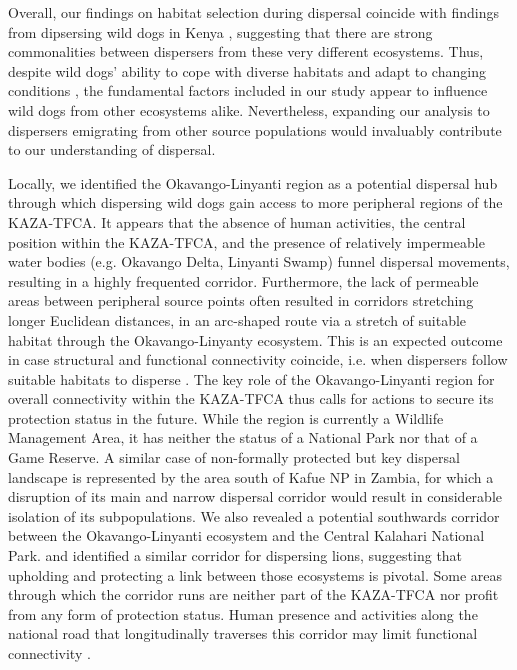 \documentclass[abstract=on,10pt,a4paper,bibliography=totocnumbered]{article}
\begin{document}
Overall, our findings on habitat selection during dispersal coincide with
findings from dipsersing wild dogs in Kenya \citep{Oneill.2020}, suggesting that
there are strong commonalities between dispersers from these very different
ecosystems. Thus, despite wild dogs' ability to cope with diverse habitats and
adapt to changing conditions \citep{Woodroffe.2011}, the fundamental factors
included in our study appear to influence wild dogs from other ecosystems alike.
Nevertheless, expanding our analysis to dispersers emigrating from other source
populations would invaluably contribute to our understanding of dispersal.

Locally, we identified the Okavango-Linyanti region as a potential dispersal hub
through which dispersing wild dogs gain access to more peripheral regions of the
KAZA-TFCA. It appears that the absence of human activities, the central position
within the KAZA-TFCA, and the presence of relatively impermeable water bodies
(e.g. Okavango Delta, Linyanti Swamp) funnel dispersal movements, resulting in a
highly frequented corridor. Furthermore, the lack of permeable areas between
peripheral source points often resulted in corridors stretching longer Euclidean
distances, in an arc-shaped route via a stretch of suitable habitat through the
Okavango-Linyanty ecosystem. This is an expected outcome in case structural and
functional connectivity coincide, i.e. when dispersers follow suitable habitats
to disperse \citep{Fattebert.2015, Hauenstein.2019}. The key role of the
Okavango-Linyanti region for overall connectivity within the KAZA-TFCA thus
calls for actions to secure its protection status in the future. While the
region is currently a Wildlife Management Area, it has neither the status of a
National Park nor that of a Game Reserve. A similar case of non-formally
protected but key dispersal landscape is represented by the area south of Kafue
NP in Zambia, for which a disruption of its main and narrow dispersal corridor
would result in considerable isolation of its subpopulations. We also revealed a
potential southwards corridor between the Okavango-Linyanti ecosystem and the
Central Kalahari National Park. \cite{Elliot.2014} and \cite{Cushman.2018}
identified a similar corridor for dispersing lions, suggesting that upholding
and protecting a link between those ecosystems is pivotal. Some areas through
which the corridor runs are neither part of the KAZA-TFCA nor profit from any
form of protection status. Human presence and activities along the national road
that longitudinally traverses this corridor may limit functional connectivity
\citep{Cozzi.2020}.
\end{document}
